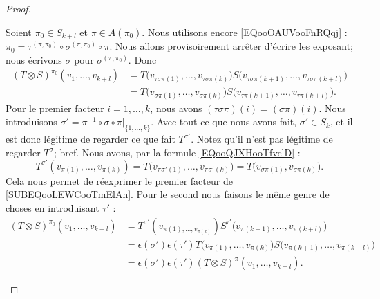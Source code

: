 \begin{proof}
\begin{subproof}
		Soient \( \pi_0\in S_{k+l}\) et \( \pi\in A(\pi_0)\). Nous utilisons encore \eqref{EQooOAUVooFnRQqj} : \( \pi_0=\tau^{(\pi,\pi_0)}\circ\sigma^{(\pi,\pi_0)}\circ\pi\). Nous allons provisoirement arrêter d'écrire les exposant; nous écrivons \( \sigma\) pour \( \sigma^{(\pi,\pi_0)}\). Donc
		\begin{subequations}
			\begin{align}
				(T\otimes S)^{\pi_0}(v_1,\ldots,v_{k+l}) & =T\big(v_{\tau\sigma\pi(1)},\ldots,v_{\tau\sigma\pi(k)}\big)S\big(v_{\tau\sigma\pi(k+1)},\ldots, v_{\tau\sigma\pi(k+l)}\big)             \\
				                                         & = T\big( v_{\sigma\pi(1)},\ldots,v_{\sigma\pi(k)} \big)S\big( v_{\tau\pi(k+1)},\ldots,v_{\tau\pi(k+l)} \big).		\label{SUBEQooLEWCooTmElAn}
			\end{align}
		\end{subequations}
		Pour le premier facteur \( i=1,\ldots,k\), nous avons \( (\tau\sigma\pi)(i)=(\sigma\pi)(i)\). Nous introduisons \( \sigma'=\pi^{-1}\circ\sigma\circ\pi|_{\{ 1,\ldots,k \}}\). Avec tout ce que nous avons fait, \( \sigma'\in S_k\), et il est donc légitime de regarder ce que fait \( T^{\sigma'}\). Notez qu'il n'est pas légitime de regarder \( T^{\sigma}\); bref. Nous avons, par la formule \eqref{EQooQJXHooTfvclD} :
		\begin{equation}
			T^{\sigma'}(v_{\pi(1)},\ldots,v_{\pi(k)})=T\big( v_{\pi\sigma'(1)},\ldots,v_{\pi\sigma'(k)} \big)=T\big( v_{\sigma\pi(1)},v_{\sigma\pi(k)} \big).
		\end{equation}
		Cela nous permet de réexprimer le premier facteur de \eqref{SUBEQooLEWCooTmElAn}. Pour le second nous faisons le même genre de choses en introduisant \( \tau'\) :
		\begin{subequations}		\label{SUBEQSooEMHQooDgCgkp}
			\begin{align}
				(T\otimes S)^{\pi_0}(v_1,\ldots,v_{k+l}) & =T^{\sigma'}(v_{\pi(1),\ldots,v_{\pi(k)}})S^{\tau'}\big( v_{\pi(k+1)},\ldots,v_{\pi(k+l)} \big)                          \\
				                                         & = \epsilon(\sigma')\epsilon(\tau')T\big( v_{\pi(1)},\ldots,v_{\pi(k)} \big)S\big( v_{\pi(k+1)},\ldots,v_{\pi(k+l)} \big) \\
				                                         & = \epsilon(\sigma')\epsilon(\tau')(T\otimes S)^{\pi}(v_1,\ldots,v_{k+l}).
			\end{align}
		\end{subequations}


\end{subproof}
\end{proof}
